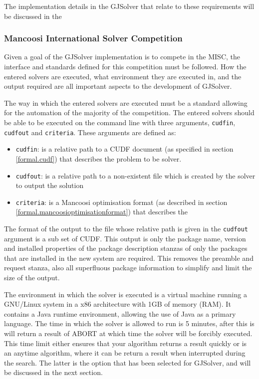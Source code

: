 The implementation details in the GJSolver that relate to these requirements will be discussed in the 

\subsubsection{Mancoosi International Solver Competition}
Given a goal of the GJSolver implementation is to compete in the MISC, the interface and standards defined for this competition must be followed.
How the entered solvers are executed, what environment they are executed in, and the output required are all important aspects to the development of GJSolver.

The way in which the entered solvers are executed must be a standard allowing for the automation of the majority of the competition.
The entered solvers should be able to be executed on the command line with three arguments, \verb+cudfin+, \verb+cudfout+ and \verb+criteria+.
These arguments are defined as:
\begin{itemize}
  \item \verb+cudfin+: is a relative path to a CUDF document (as specified in section \ref{formal.cudf}) that describes the problem to be solver.
  \item \verb+cudfout+: is a relative path to a non-existent file which is created by the solver to output the solution
  \item \verb+criteria+: is a Mancoosi optimisation format (as described in section \ref{formal.mancoosioptimisationformat}) that describes the 
\end{itemize}
The format of the output to the file whose relative path is given in the \verb+cudfout+ argument is a sub set of CUDF.
This output is only the package name, version and installed properties of the package description stanzas of only the packages that are installed in the new system are required.
This removes the preamble and request stanza, also all superfluous package information to simplify and limit the size of the output.

The environment in which the solver is executed is a virtual machine running a GNU/Linux system in a x86 architecture with 1GB of memory (RAM).
It contains a Java runtime environment, allowing the use of Java as a primary language.
The time in which the solver is allowed to run is 5 minutes, after this is will return a result of ABORT at which time the solver will be forcibly executed.
This time limit either ensures that your algorithm returns a result quickly or is an anytime algorithm, where it can be return a result when interrupted during the search.
The latter is the option that has been selected for GJSolver, and will be discussed in the next section.

